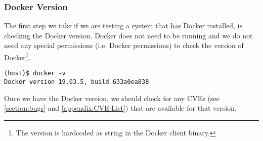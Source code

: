 \subsubsection{Docker Version}\label{subsubsection:version}
The first step we take if we are testing a system that has Docker installed, is checking the Docker version. Docker does not need to be running and we do not need any special permissions (i.e. Docker permissions) to check the version of Docker\footnote{The version is hardcoded as string in the Docker client binary.}.

\begin{lstlisting}[caption={Show Docker version.},captionpos=b]
(host)$ docker -v
Docker version 19.03.5, build 633a0ea838
\end{lstlisting}

Once we have the Docker version, we should check for any CVEs (see \autoref{section:bugs} and \autoref{appendix:CVE-List}) that are available for that version.

